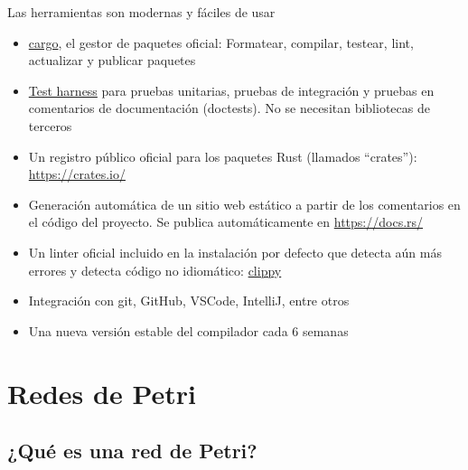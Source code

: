 \documentclass{beamer}
\begin{document}
\begin{frame}{Las herramientas son modernas y fáciles de usar}
  \begin{itemize}
    \item \href{https://doc.rust-lang.org/stable/cargo/}{cargo},
          el gestor de paquetes oficial: Formatear, compilar, testear, lint, actualizar y publicar paquetes
    \item \href{https://doc.rust-lang.org/book/ch11-00-testing.html}{Test harness}
          para pruebas unitarias, pruebas de integración y pruebas en comentarios de documentación (doctests).
          No se necesitan bibliotecas de terceros
    \item Un registro público oficial para los paquetes Rust (llamados ``crates''): \url{https://crates.io/}
    \item Generación automática de un sitio web estático a partir de los comentarios en el código del proyecto.
          Se publica automáticamente en \url{https://docs.rs/}
    \item Un linter oficial incluido en la instalación por defecto que detecta aún más errores
          y detecta código no idiomático: \href{https://github.com/rust-lang/rust-clippy}{clippy}
    \item Integración con git, GitHub, VSCode, IntelliJ, entre otros
    \item Una nueva versión estable del compilador cada 6 semanas \cite{albini2019}
  \end{itemize}
\end{frame}

\section{Redes de Petri}

\subsection{¿Qué es una red de Petri?}
\end{document}
